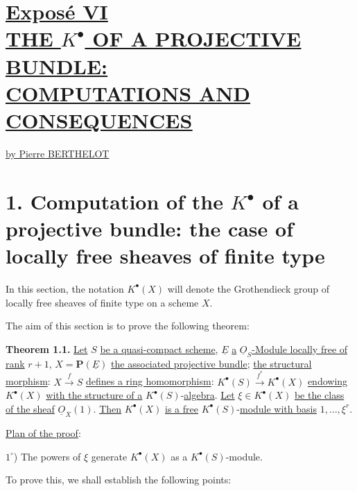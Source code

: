 %
\section*{\underline{Exposé VI}\\[3pt] \underline{\underline{THE \(K^{\bullet}\) OF A PROJECTIVE BUNDLE:}}\\[3pt] \underline{\underline{COMPUTATIONS AND CONSEQUENCES}}}
\renewcommand{\Sym}{\mathbf{S}}
\renewcommand{\Projz}{\underline{\operatorname{Proj}}_0}
\begin{center}
\underline{by Pierre BERTHELOT}
\end{center}

\section*{1. Computation of the \(K^{\bullet}\) of a projective bundle: the case of locally free sheaves of finite type}

In this section, the notation \(K^{\bullet}(X)\) will denote the Grothendieck group of locally free sheaves of finite type on a scheme \(X\).

The aim of this section is to prove the following theorem:

\textbf{Theorem 1.1.} \uline{Let} \(S\) \uline{be a quasi-compact scheme}, \(\underline{E}\) \uline{a} \(\underline{O}_S\)\uline{-Module locally free of rank} \(r+1\), \(X=\mathbf P(\underline{E})\) \uline{the associated projective bundle}; \uline{the structural morphism}: \(X\xrightarrow{f}S\) \uline{defines a ring homomorphism}: \(K^{\bullet}(S) \xrightarrow{f^*} K^{\bullet}(X)\) \uline{endowing} \(K^{\bullet}(X)\) \uline{with the structure of a} \(K^{\bullet}(S)\)-\uline{algebra}. \uline{Let} \(\xi\in K^{\bullet}(X)\) \uline{be the class of the sheaf} \(\underline{O}_X(1)\). \uline{Then} \(K^{\bullet}(X)\) \uline{is a free} \(K^{\bullet}(S)\)-\uline{module with basis} \(1,\ldots,\xi^r\).

\uline{Plan of the proof}:

\(1^\circ\)) The powers of \(\xi\) generate \(K^{\bullet}(X)\) as a \(K^{\bullet}(S)\)-module.

To prove this, we shall establish the following points:

